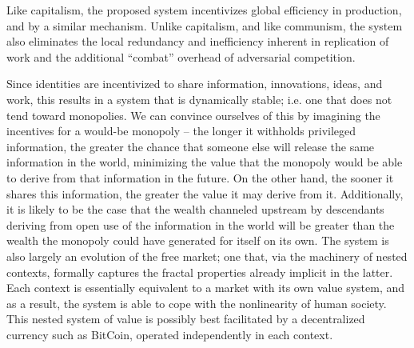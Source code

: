 \documentclass[pra,twocolumn,groupedaddress,10pt]{revtex4}
\theoremstyle{definition}
\begin{document}
Like capitalism, the proposed system incentivizes global efficiency in production, and by a similar mechanism. Unlike capitalism, and like communism, the system also eliminates the local redundancy and inefficiency inherent in replication of work and the additional ``combat'' overhead of adversarial competition.

Since identities are incentivized to share information, innovations, ideas, and work, this results in a system that is dynamically stable; i.e. one that does not tend toward monopolies. We can convince ourselves of this by imagining the incentives for a would-be monopoly -- the longer it withholds privileged information, the greater the chance that someone else will release the same information in the world, minimizing the value that the monopoly would be able to derive from that information in the future. On the other hand, the sooner it shares this information, the greater the value it may derive from it. Additionally, it is likely to be the case that the wealth channeled upstream by descendants deriving from open use of the information in the world will be greater than the wealth the monopoly could have generated for itself on its own. The system is also largely an evolution of the free market; one that, via the machinery of nested contexts, formally captures the fractal properties already implicit in the latter. Each context is essentially equivalent to a market with its own value system, and as a result, the system is able to cope with the nonlinearity of human society. This nested system of value is possibly best facilitated by a decentralized currency such as BitCoin\cite{bitcoin}, operated independently in each context.
\end{document}
